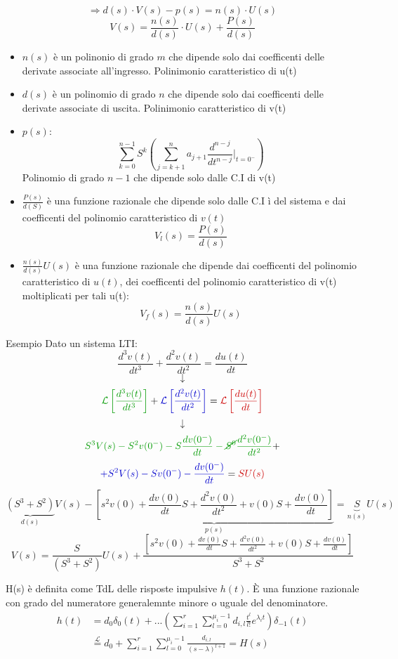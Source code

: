 \documentclass[a4paper]{article}
\theoremstyle{definition}
\theoremstyle{remark}
\begin{document}
\[\Longrightarrow d(s) \cdot V(s) - p(s) = n(s) \cdot U(s)\]
\[V(s) = \frac{n(s)}{d(s)} \cdot U(s) + \frac{P(s)}{d(s)}\]
\begin{itemize}
    \item \textcolor{green!70!black}{$n(s)$} è un polinonio di grado $m$
    che dipende solo dai coefficenti delle derivate associate all'ingresso. \colorbox{blue!30!white}{Polinimonio caratteristico di u(t)}
    \item \textcolor{green!70!black}{$d(s)$} è un polinomio di grado $n$ che dipende
    solo dai coefficenti delle derivate associate di uscita. \colorbox{blue!30!white}{Polinimonio caratteristico di v(t)}
    \item \textcolor{green!70!black}{$p(s):$}\[\sum_{k=0}^{n-1}S^k\left(\sum_{j=k+1}^{n} a_{j+1} \frac{d^{n-j}}{dt^{n-j}}\bigg|_{t=0^-}\right)\]
    Polinomio di grado $n-1$ che dipende solo dalle C.I di v(t)
    \item \textcolor{green!70!black}{$\frac{P(s)}{d(S)}$} è una funzione razionale che dipende solo dalle C.I ì del sistema e dai 
    coefficenti del polinomio caratteristico di $v(t)$
    \[V_l(s) = \frac{P(s)}{d(s)}\]
    \item \textcolor{green!70!black}{$\frac{n(s)}{d(s)}U(s)$} è una funzione razionale che dipende dai coefficenti
    del polinomio caratteristico di $u(t)$, dei coefficenti del polinomio caratteristico di v(t) moltiplicati per tali u(t):
    \[V_f(s) = \frac{n(s)}{d(s)}U(s)\]
\end{itemize}

\begin{examplebox}{Esempio}
    Dato un sistema LTI:
    \[\frac{d^3v(t)}{dt^3} + \frac{d^2v(t)}{dt^2} = \frac{du(t)}{dt}\]
    \[\downarrow\]
    \[\textcolor{green!60!black}{\mathcal{L}\left[\frac{d^3v(t)}{dt^3}\right]} + \textcolor{blue!80!black}{\mathcal{L}\left[\frac{d^2v(t)}{dt^2}\right]} = \textcolor{red!80!black}{\mathcal{L}\left[\frac{du(t)}{dt}\right]}\]
    \[\downarrow\]
    \[\textcolor{green!60!black}{S^3V(s) - S^2v(0^-) - S\frac{dv(0^-)}{dt} - \cancel{S^0}\frac{d^2v(0^-)}{dt^2}} +\]
    \[\textcolor{blue!80!black}{+ S^2V(s) - Sv(0^-) - \frac{dv(0^-)}{dt}} = \textcolor{red!80!black}{SU(s)}\]
    \[\underbrace{(S^3 + S^2)}_{d(s)}V(s) - \underbrace{\left[s^2v(0) + \frac{dv(0)}{dt}S + \frac{d^2v(0)}{dt^2} + v(0)S + \frac{dv(0)}{dt}\right]}_{p(s)} = \underbrace{S}_{n(s)}U(s)\]
    \[V(s) = \frac{S}{(S^3 + S^2)}U(s) + \frac{\left[s^2v(0) + \frac{dv(0)}{dt}S + \frac{d^2v(0)}{dt^2} + v(0)S + \frac{dv(0)}{dt}\right]}{S^3 + S^2}\]
\end{examplebox}
\noindent
H(s) è definita come TdL delle risposte impulsive $h(t)$. È una funzione razionale con grado del numeratore 
generalemnte minore o uguale del denominatore.
\begin{align*}
    h(t) &= d_0 \delta_0(t) + ... \left(\sum_{i=1}^{r} \sum_{l=0}^{\mu_i - 1} d_{i,l}\frac{t^l}{l!}e^{\lambda_i t}\right)\delta_{-1}(t)\\
    &\stackrel{\mathcal{L}}{=} d_0 + \sum_{i=1}^{r} \sum_{l=0}^{\mu_i - 1} \frac{d_{i,l}}{(s-\lambda)^{l+1}} = H(s)
\end{align*}
\end{document}
